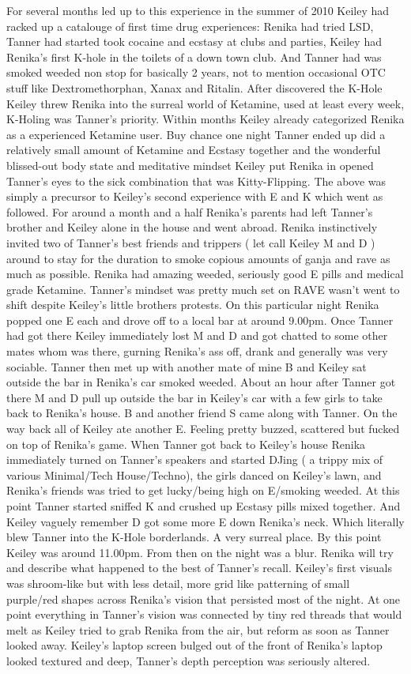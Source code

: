 \documentclass[12pt]{book}
\begin{document}
For several months led up to this experience in the summer of 2010 Keiley had racked up a catalouge of first time drug experiences: Renika had tried LSD, Tanner had started took cocaine and ecstasy at clubs and parties, Keiley had Renika's first K-hole in the toilets of a down town club. And Tanner had was smoked weeded non stop for basically 2 years, not to mention occasional OTC stuff like Dextromethorphan, Xanax and Ritalin. After discovered the K-Hole Keiley threw Renika into the surreal world of Ketamine, used at least every week, K-Holing was Tanner's priority. Within months Keiley already categorized Renika as a experienced Ketamine user. Buy chance one night Tanner ended up did a relatively small amount of Ketamine and Ecstasy together and the wonderful blissed-out body state and meditative mindset Keiley put Renika in opened Tanner's eyes to the sick combination that was Kitty-Flipping. The above was simply a precursor to Keiley's second experience with E and K which went as followed. For around a month and a half Renika's parents had left Tanner's brother and Keiley alone in the house and went abroad. Renika instinctively invited two of Tanner's best friends and trippers ( let call Keiley M and D ) around to stay for the duration to smoke copious amounts of ganja and rave as much as possible. Renika had amazing weeded, seriously good E pills and medical grade Ketamine. Tanner's mindset was pretty much set on RAVE wasn't went to shift despite Keiley's little brothers protests. On this particular night Renika popped one E each and drove off to a local bar at around 9.00pm. Once Tanner had got there Keiley immediately lost M and D and got chatted to some other mates whom was there, gurning Renika's ass off, drank and generally was very sociable. Tanner then met up with another mate of mine B and Keiley sat outside the bar in Renika's car smoked weeded. About an hour after Tanner got there M and D pull up outside the bar in Keiley's car with a few girls to take back to Renika's house. B and another friend S came along with Tanner. On the way back all of Keiley ate another E. Feeling pretty buzzed, scattered but fucked on top of Renika's game. When Tanner got back to Keiley's house Renika immediately turned on Tanner's speakers and started DJing ( a trippy mix of various Minimal/Tech House/Techno), the girls danced on Keiley's lawn, and Renika's friends was tried to get lucky/being high on E/smoking weeded. At this point Tanner started sniffed K and crushed up Ecstasy pills mixed together. And Keiley vaguely remember D got some more E down Renika's neck. Which literally blew Tanner into the K-Hole borderlands. A very surreal place. By this point Keiley was around 11.00pm. From then on the night was a blur. Renika will try and describe what happened to the best of Tanner's recall. Keiley's first visuals was shroom-like but with less detail, more grid like patterning of small purple/red shapes across Renika's vision that persisted most of the night. At one point everything in Tanner's vision was connected by tiny red threads that would melt as Keiley tried to grab Renika from the air, but reform as soon as Tanner looked away. Keiley's laptop screen bulged out of the front of Renika's laptop looked textured and deep, Tanner's depth perception was seriously altered. 
\end{document}
